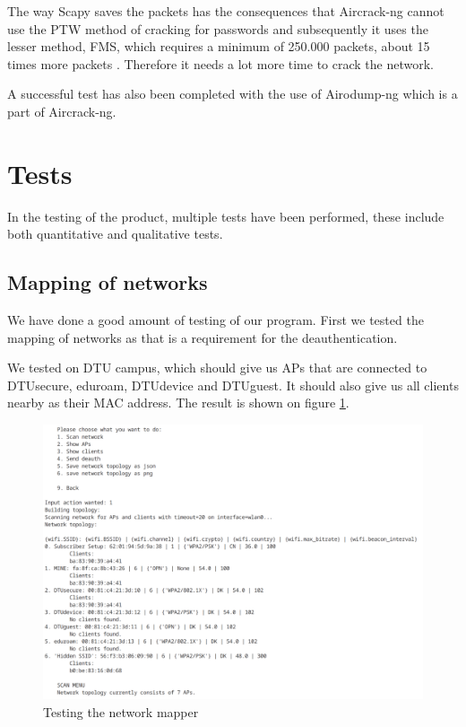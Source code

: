 The way Scapy saves the packets has the consequences that Aircrack-ng cannot use the PTW method of cracking for passwords and subsequently it uses the lesser method, FMS, which requires a minimum of 250.000 packets, about 15 times more packets \cite{Weakness}. Therefore it needs a lot more time to crack the network. 


A successful test has also been completed with the use of Airodump-ng which is a part of Aircrack-ng.

\section{Tests}
In the testing of the product, multiple tests have been performed, these include both quantitative and qualitative tests. 
\subsection{Mapping of networks}
We have done a good amount of testing of our program. First we tested the mapping of networks as that is a requirement for the deauthentication. 

We tested on DTU campus, which should give us APs that are connected to DTUsecure, eduroam, DTUdevice and DTUguest. It should also give us all clients nearby as their MAC address. The result is shown on figure \ref{test1}.

\begin{figure}[!htbp]
    \centering
    \includegraphics[width=\textwidth]{Latex-Files/Billeder/Tests/scan_network.png}
    \caption{Testing the network mapper}
    \label{test1}
\end{figure}

